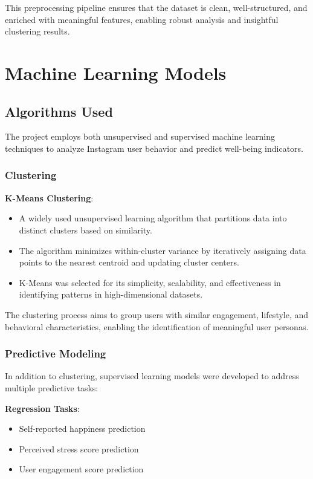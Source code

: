 \documentclass[12pt,a4paper]{article}
\begin{document}
This preprocessing pipeline ensures that the dataset is clean, well-structured, and enriched with meaningful features, enabling robust analysis and insightful clustering results.
\section{Machine Learning Models}

\subsection{Algorithms Used}
The project employs both unsupervised and supervised machine learning techniques to analyze Instagram user behavior and predict well-being indicators.

\subsubsection{Clustering}

\textbf{K-Means Clustering}:
\begin{itemize}
    \item A widely used unsupervised learning algorithm that partitions data into distinct clusters based on similarity.
    \item The algorithm minimizes within-cluster variance by iteratively assigning data points to the nearest centroid and updating cluster centers.
    \item K-Means was selected for its simplicity, scalability, and effectiveness in identifying patterns in high-dimensional datasets.
\end{itemize}

The clustering process aims to group users with similar engagement, lifestyle, and behavioral characteristics, enabling the identification of meaningful user personas.

\subsubsection{Predictive Modeling}

In addition to clustering, supervised learning models were developed to address multiple predictive tasks:

\textbf{Regression Tasks}:
\begin{itemize}
    \item Self-reported happiness prediction
    \item Perceived stress score prediction
    \item User engagement score prediction
\end{itemize}
\end{document}
